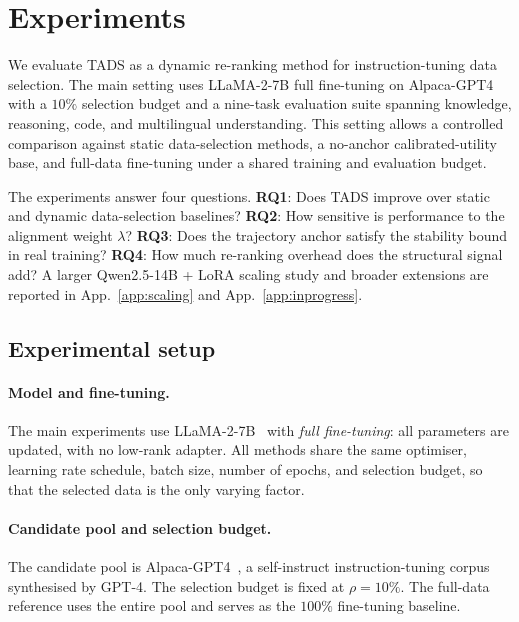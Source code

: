 \section{Experiments}
\label{sec:experiments}

We evaluate \textsc{TADS} as a dynamic re-ranking method for
instruction-tuning data selection. The main setting uses
LLaMA-2-7B full fine-tuning on Alpaca-GPT4 with a $10\%$ selection
budget and a nine-task evaluation suite spanning knowledge,
reasoning, code, and multilingual understanding. This setting
allows a controlled comparison against static data-selection
methods, a no-anchor calibrated-utility base, and full-data
fine-tuning under a shared training and evaluation budget.

The experiments answer four questions. \textbf{RQ1}: Does
\textsc{TADS} improve over static and dynamic data-selection
baselines? \textbf{RQ2}: How sensitive is performance to the
alignment weight $\lambda$? \textbf{RQ3}: Does the trajectory
anchor satisfy the stability bound in real training? \textbf{RQ4}:
How much re-ranking overhead does the structural signal add? A
larger Qwen2.5-14B + LoRA scaling study and broader extensions are
reported in App.~\ref{app:scaling} and App.~\ref{app:inprogress}.

\subsection{Experimental setup}
\label{sec:setup}

\paragraph{Model and fine-tuning.}
The main experiments use LLaMA-2-7B~\cite{touvron2023llama2} with
\emph{full fine-tuning}: all parameters are updated, with no
low-rank adapter. All methods share the same optimiser, learning
rate schedule, batch size, number of epochs, and selection budget,
so that the selected data is the only varying factor.

\paragraph{Candidate pool and selection budget.}
The candidate pool is Alpaca-GPT4~\cite{alpaca_gpt4}, a
self-instruct instruction-tuning corpus synthesised by GPT-4. The
selection budget is fixed at $\rho=10\%$. The full-data reference
uses the entire pool and serves as the $100\%$ fine-tuning baseline.

